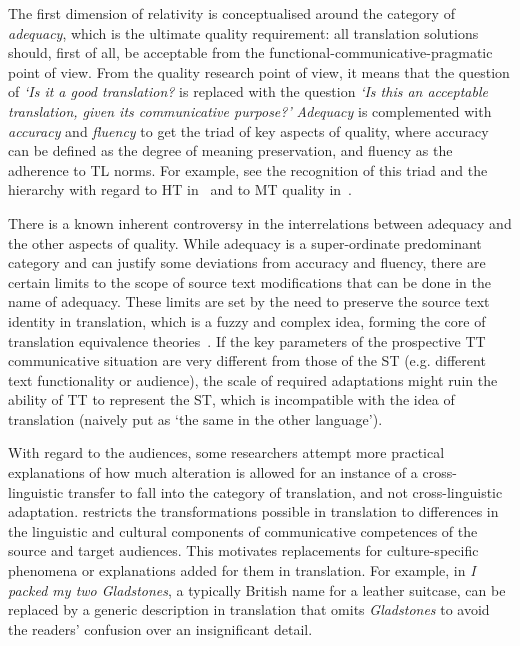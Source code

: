The first dimension of relativity is conceptualised around the category of \textit{adequacy}, which is the ultimate quality requirement: all translation solutions should, first of all, be acceptable from the functional-communicative-pragmatic point of view. From the quality research point of view, it means that the question of \emph{`Is it a good translation?} is replaced with the question \emph{`Is this an acceptable translation, given its communicative purpose?'}
\textit{Adequacy} is complemented with \textit{accuracy} and \textit{fluency} to get the triad of key aspects of quality, where accuracy can be defined as the degree of meaning preservation, and fluency as the adherence to TL norms. For example, see the recognition of this triad and the hierarchy with regard to HT in~\citet{Chesterman1998} and to MT quality in~\citet{Koponen2010}.

There is a known inherent controversy in the interrelations between adequacy and the other aspects of quality. While adequacy is a super-ordinate predominant category and can justify some deviations from accuracy and fluency, there are certain limits to the scope of source text modifications that can be done in the name of adequacy. These limits are set by the need to preserve the source text identity in translation, which is a fuzzy and complex idea, forming the core of translation equivalence theories~\cite[such as proposed by][]{Nida1964}. 
If the key parameters of the prospective TT communicative situation are very different from those of the ST (e.g. different text functionality or audience), the scale of required adaptations might ruin the ability of TT to represent the ST, which is incompatible with the idea of translation (naively put as `the same in the other language').

With regard to the audiences, some researchers attempt more practical explanations of how much alteration is allowed for an instance of a cross-linguistic transfer to fall into the category of translation, and not cross-linguistic adaptation. \citet{Latyshev2003} restricts the transformations possible in translation to differences in the linguistic and cultural components of communicative competences of the source and target audiences. This motivates replacements for culture-specific phenomena or explanations added for them in translation. For example, in \textit{I packed my two Gladstones}, a typically British name for a leather suitcase, can be replaced by a generic description in translation that omits \textit{Gladstones} to avoid the readers' confusion over an insignificant detail.

